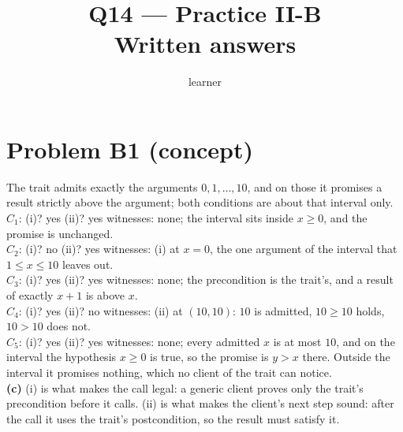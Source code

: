 \documentclass[11pt]{article}
\title{Q14 --- Practice II-B \\ \large Written answers}
\author{learner}
\date{}
\begin{document}
\maketitle
\sloppy

\section*{Problem B1 (concept)}\label{ans:B1}
\begin{answer}
The trait admits exactly the arguments $0, 1, \dots, 10$, and on those it
promises a result strictly above the argument; both conditions are about that
interval only. \\
$C_1$: (i)? yes \quad (ii)? yes \quad witnesses: none; the interval sits
inside $x \ge 0$, and the promise is unchanged. \\
$C_2$: (i)? no \quad (ii)? yes \quad witnesses: (i) at $x = 0$, the one
argument of the interval that $1 \le x \le 10$ leaves out. \\
$C_3$: (i)? yes \quad (ii)? yes \quad witnesses: none; the precondition is
the trait's, and a result of exactly $x + 1$ is above $x$. \\
$C_4$: (i)? yes \quad (ii)? no \quad witnesses: (ii) at $(10, 10)$: $10$ is
admitted, $10 \ge 10$ holds, $10 > 10$ does not. \\
$C_5$: (i)? yes \quad (ii)? yes \quad witnesses: none; every admitted $x$
is at most $10$, and on the interval the hypothesis $x \ge 0$ is true, so the
promise is $y > x$ there. Outside the interval it promises nothing, which no
client of the trait can notice. \\
\textbf{(c)} (i) is what makes the call legal: a generic client proves only
the trait's precondition before it calls. (ii) is what makes the client's next
step sound: after the call it uses the trait's postcondition, so the result
must satisfy it.
\end{answer}

\end{document}
